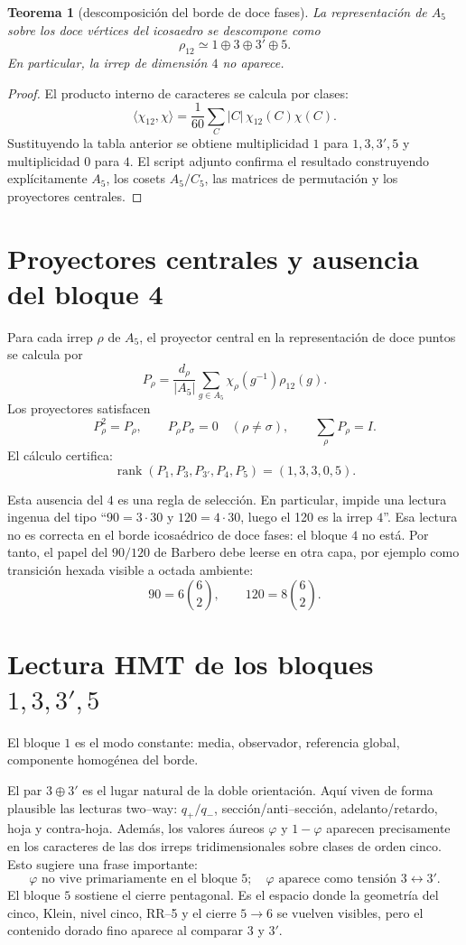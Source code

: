 \documentclass[11pt,a4paper]{article}
\newtheorem{teorema}{Teorema}
\begin{document}
\begin{teorema}[descomposición del borde de doce fases]
La representación de $A_5$ sobre los doce vértices del icosaedro se descompone como
\[
\boxed{\rho_{12}\simeq 1\oplus3\oplus3'\oplus5.}
\]
En particular, la irrep de dimensión $4$ no aparece.
\end{teorema}

\begin{proof}
El producto interno de caracteres se calcula por clases:
\[
\langle\chi_{12},\chi\rangle=\frac1{60}\sum_C |C|\,\chi_{12}(C)\chi(C).
\]
Sustituyendo la tabla anterior se obtiene multiplicidad $1$ para $1,3,3',5$ y multiplicidad $0$ para $4$. El script adjunto confirma el resultado construyendo explícitamente $A_5$, los cosets $A_5/C_5$, las matrices de permutación y los proyectores centrales.\end{proof}

\section{Proyectores centrales y ausencia del bloque 4}
Para cada irrep $\rho$ de $A_5$, el proyector central en la representación de doce puntos se calcula por
\[
P_\rho=\frac{d_\rho}{|A_5|}\sum_{g\in A_5}\chi_\rho(g^{-1})\rho_{12}(g).
\]
Los proyectores satisfacen
\[
P_\rho^2=P_\rho,\qquad P_\rho P_\sigma=0\quad(\rho\neq\sigma),\qquad \sum_\rho P_\rho=I.
\]
El cálculo certifica:
\[
\operatorname{rank}(P_1,P_3,P_{3'},P_4,P_5)=(1,3,3,0,5).
\]

Esta ausencia del $4$ es una regla de selección. En particular, impide una lectura ingenua del tipo ``$90=3\cdot30$ y $120=4\cdot30$, luego el 120 es la irrep $4$''. Esa lectura no es correcta en el borde icosaédrico de doce fases: el bloque $4$ no está. Por tanto, el papel del $90/120$ de Barbero debe leerse en otra capa, por ejemplo como transición hexada visible a octada ambiente:
\[
90=6\binom62,\qquad 120=8\binom62.
\]

\section{Lectura HMT de los bloques $1,3,3',5$}
El bloque $1$ es el modo constante: media, observador, referencia global, componente homogénea del borde.

El par $3\oplus3'$ es el lugar natural de la doble orientación. Aquí viven de forma plausible las lecturas two--way: $q_+/q_-$, sección/anti--sección, adelanto/retardo, hoja y contra-hoja. Además, los valores áureos $\varphi$ y $1-\varphi$ aparecen precisamente en los caracteres de las dos irreps tridimensionales sobre clases de orden cinco. Esto sugiere una frase importante:
\[
\boxed{\varphi\text{ no vive primariamente en el bloque }5;\quad \varphi\text{ aparece como tensión }3\leftrightarrow3'.}
\]
El bloque $5$ sostiene el cierre pentagonal. Es el espacio donde la geometría del cinco, Klein, nivel cinco, RR--5 y el cierre $5\to6$ se vuelven visibles, pero el contenido dorado fino aparece al comparar $3$ y $3'$.
\end{document}
